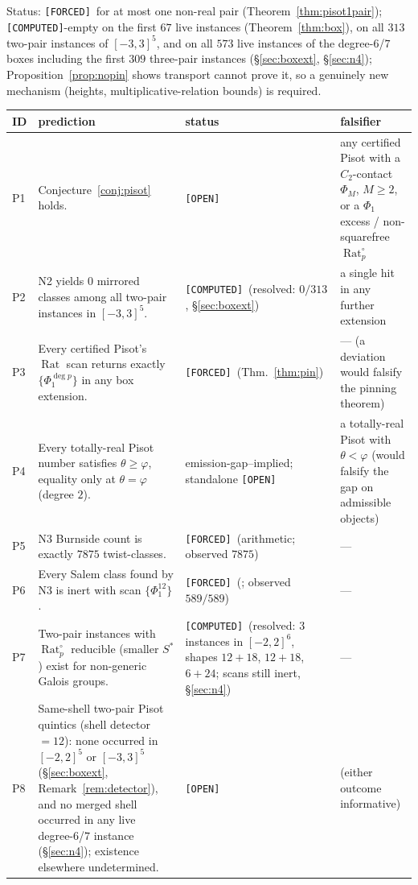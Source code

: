\documentclass[11pt]{article}
\newcommand{\F}{\textnormal{\texttt{[FORCED]}}}
\newcommand{\C}{\textnormal{\texttt{[COMPUTED]}}}
\newcommand{\Op}{\textnormal{\texttt{[OPEN]}}}
\newcommand{\Rat}{\operatorname{Rat}}
\theoremstyle{definition}
\begin{document}
Status: \F\ for at most one non-real pair (Theorem~\ref{thm:pisot1pair});
\C-empty on the first $67$ live instances (Theorem~\ref{thm:box}), on all
$313$ two-pair instances of $[-3,3]^5$, and on all $573$ live instances of
the degree-$6$/$7$ boxes including the first $309$ three-pair instances
(\S\ref{sec:boxext}, \S\ref{sec:n4});
Proposition~\ref{prop:nopin} shows transport cannot prove it, so a genuinely
new mechanism (heights, multiplicative-relation bounds) is required.

\begin{center}
\small
\begin{tabular}{p{0.6cm}p{8.2cm}p{2.4cm}p{3.6cm}}
\hline
ID & prediction & status & falsifier\\
\hline
P1 & Conjecture~\ref{conj:pisot} holds. & \Op & any certified Pisot with a
$C_2$-contact $\Phi_M$, $M\ge2$, or a $\Phi_1$ excess / non-squarefree
$\Rat_p^{\circ}$\\
P2 & N2 yields $0$ mirrored classes among all two-pair instances in
$[-3,3]^5$. & \C\ (resolved: $0/313$, \S\ref{sec:boxext}) & a single hit in
any further extension\\
P3 & Every certified Pisot's $\Rat$ scan returns exactly $\{\Phi_1^{\deg p}\}$
in any box extension. & \F\ (Thm.~\ref{thm:pin}) & --- (a deviation would
falsify the pinning theorem)\\
P4 & Every totally-real Pisot number satisfies $\theta\ge\varphi$, equality
only at $\theta=\varphi$ (degree $2$). & emission-gap--implied; standalone
\Op & a totally-real Pisot with $\theta<\varphi$ (would falsify the gap on
admissible objects)\\
P5 & N3 Burnside count is exactly $7875$ twist-classes. & \F\ (arithmetic;
observed $7875$) & ---\\
P6 & Every Salem class found by N3 is inert with scan $\{\Phi_1^{12}\}$.
& \F\ (\cite[Cor.~7.14]{relcharge}; observed $589/589$) & ---\\
P7 & Two-pair instances with $\Rat_p^{\circ}$ reducible (smaller $S^{*}$)
exist for non-generic Galois groups. & \C\ (resolved: $3$ instances in
$[-2,2]^6$, shapes $12{+}18$, $12{+}18$, $6{+}24$; scans still inert,
\S\ref{sec:n4}) & ---\\
P8 & Same-shell two-pair Pisot quintics (shell detector $=12$): none occurred
in $[-2,2]^5$ or $[-3,3]^5$ (\S\ref{sec:boxext},
Remark~\ref{rem:detector}), and no merged shell occurred in any live
degree-$6$/$7$ instance (\S\ref{sec:n4}); existence elsewhere undetermined.
& \Op & (either outcome informative)\\
\hline
\end{tabular}
\end{center}
\end{document}
